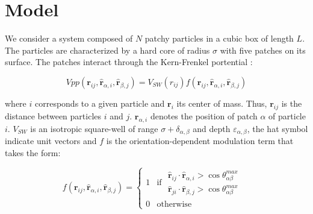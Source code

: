 \documentclass[a4paper, amsfonts, amssymb, amsmath, reprint, showkeys, nofootinbib, twoside]{revtex4-1}
\begin{document}



\section{Model}

We consider a system composed of $N$ patchy particles in a cubic box of length $L$. The particles are characterized by a hard core of radius $\sigma$ with five patches on its surface. The patches interact through the Kern-Frenkel portential \cite{Kern2003}:

\begin{equation}
Vpp(\boldsymbol{r}_{ij}, \boldsymbol{\hat{r}}_{\alpha, i}, \boldsymbol{\hat{r}}_{\beta, j})=V_{SW}(r_{ij})f(\boldsymbol{r}_{ij}, \boldsymbol{\hat{r}}_{\alpha, i}, \boldsymbol{\hat{r}}_{\beta, j})
\end{equation}

where $i$ corresponds to a given particle and $\boldsymbol{r}_{i}$ its center of mass. Thus, $\boldsymbol{r}_{ij}$ is the distance between particles $i$ and $j$. $\boldsymbol{r}_{\alpha, i}$ denotes the position of patch $\alpha$ of particle $i$. $V_{SW}$ is an isotropic square-well of range $\sigma + \delta_{\alpha,\beta}$ and depth $\varepsilon_{\alpha,\beta}$, the hat symbol indicate unit vectors and $f$ is the orientation-dependent modulation term that takes the form:

\begin{equation}
\label{KF}
f(\boldsymbol{r}_{ij}, \boldsymbol{\hat{r}}_{\alpha, i}, \boldsymbol{\hat{r}}_{\beta, j})=
    \begin{cases}
        1 & \text{if $\begin{aligned}
            \text{$\boldsymbol{\hat{r}}_{ij} \cdot \boldsymbol{\hat{r}}_{\alpha, i} > \cos     \theta^{max}_{\alpha \beta}$} \\
            \text{$\boldsymbol{\hat{r}}_{ji} \cdot \boldsymbol{\hat{r}}_{\beta, j} > \cos     \theta^{max}_{\alpha \beta}$}
        \end{aligned}$ } \\
        0 & \text{otherwise}
    \end{cases}
\end{equation}
\end{document}

